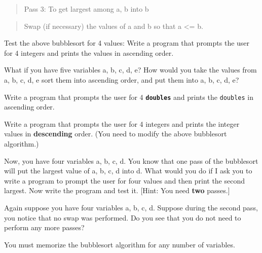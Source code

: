 \begin{quote}
Pass 3: To get largest among a, b into b
\end{quote}
\begin{tightlist}
\li
  \begin{quote}
  Swap (if necessary) the values of a and b so that a <= b.
  \end{quote}
\end{tightlist}

\begin{ex}
Test the above bubblesort for 4 values: Write a program that prompts the user for 4 integers and prints the values in ascending order.
\end{ex}

\begin{ex}
What if you have five variables a, b, c, d, e? How would you take the values from a, b, c, d, e sort them into ascending order, and put them into a, b, c, d, e?
\end{ex}

\begin{ex}
Write a program that prompts the user for 4 \texttt{\textbf{doubles}} and prints the \texttt{doubles} in ascending order.
\end{ex}

\begin{ex}
Write a program that prompts the user for 4 integers and prints the integer values in \textbf{descending} order. (You need to modify the above bubblesort algorithm.)
\end{ex}

\begin{ex}
Now, you have four variables a, b, c, d. You know that one pass of the bubblesort will put the largest value of a, b, c, d into d. What would you do if I ask you to write a program to prompt the user for four values and then print the second largest. Now write the program and test it. [Hint: You need \textbf{two} passes.]
\end{ex}

\begin{ex}
Again suppose you have four variables a, b, c, d. Suppose during the second pass, you notice that no swap was performed. Do you see that you do not need to perform any more passes?
\end{ex}

You must memorize the bubblesort algorithm for any number of variables.
